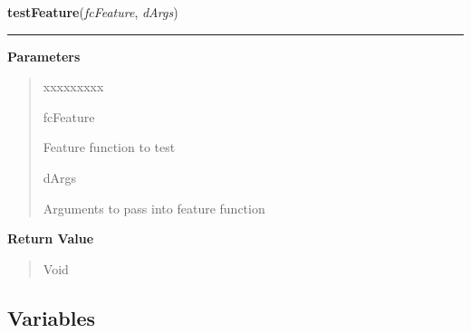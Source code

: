     \label{QSTK:qstkfeat:featutil:testFeature}

    \vspace{0.5ex}

\hspace{.8\funcindent}\begin{boxedminipage}{\funcwidth}

    \raggedright \textbf{testFeature}(\textit{fcFeature}, \textit{dArgs})

    \vspace{-1.5ex}

    \rule{\textwidth}{0.5\fboxrule}
\setlength{\parskip}{2ex}
\setlength{\parskip}{1ex}
      \textbf{Parameters}
      \vspace{-1ex}

      \begin{quote}
        \begin{Ventry}{xxxxxxxxx}

          \item[fcFeature]

          Feature function to test

          \item[dArgs]

          Arguments to pass into feature function

        \end{Ventry}

      \end{quote}

      \textbf{Return Value}
    \vspace{-1ex}

      \begin{quote}
      Void

      \end{quote}

    \end{boxedminipage}



  \subsection{Variables}

